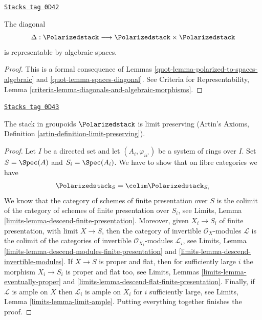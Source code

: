 \begin{lemma}
\label{quot-lemma-polarized-diagonal}
\href{https://stacks.math.columbia.edu/tag/0D42}{\texttt{Stacks tag 0D42}}

The diagonal
$$
\Delta : \Polarizedstack \longrightarrow
\Polarizedstack \times \Polarizedstack
$$
is representable by algebraic spaces.
\end{lemma}

\begin{proof}

This is a formal consequence of
Lemmas \ref{quot-lemma-polarized-to-spaces-algebraic} and
\ref{quot-lemma-spaces-diagonal}.
See Criteria for Representability, Lemma
\ref{criteria-lemma-diagonals-and-algebraic-morphisms}.
\end{proof}

\begin{lemma}
\label{quot-lemma-polarized-limits}
\href{https://stacks.math.columbia.edu/tag/0D43}{\texttt{Stacks tag 0D43}}

The stack in groupoids $\Polarizedstack$ is limit preserving
(Artin's Axioms, Definition \ref{artin-definition-limit-preserving}).
\end{lemma}

\begin{proof}
Let $I$ be a directed set and let $(A_i, \varphi_{ii'})$
be a system of rings over $I$. Set $S = \Spec(A)$ and
$S_i = \Spec(A_i)$. We have to show that on fibre categories we have
$$
\Polarizedstack_S = \colim \Polarizedstack_{S_i}
$$
We know that the category of schemes of finite presentation over
$S$ is the colimit of the category of schemes of finite presentation
over $S_i$, see
Limits, Lemma \ref{limits-lemma-descend-finite-presentation}.
Moreover, given $X_i \to S_i$ of finite presentation, with
limit $X \to S$, then the category of invertible
$\mathcal{O}_X$-modules $\mathcal{L}$ is the colimit of the categories
of invertible $\mathcal{O}_{X_i}$-modules $\mathcal{L}_i$, see
Limits, Lemma \ref{limits-lemma-descend-modules-finite-presentation} and
\ref{limits-lemma-descend-invertible-modules}.
If $X \to S$ is proper and flat, then for sufficiently large
$i$ the morphism $X_i \to S_i$ is proper and flat too, see
Limits, Lemmas \ref{limits-lemma-eventually-proper} and
\ref{limits-lemma-descend-flat-finite-presentation}.
Finally, if $\mathcal{L}$ is ample on $X$
then $\mathcal{L}_i$ is ample on $X_i$ for
$i$ sufficiently large, see
Limits, Lemma \ref{limits-lemma-limit-ample}.
Putting everything together finishes the proof.
\end{proof}

